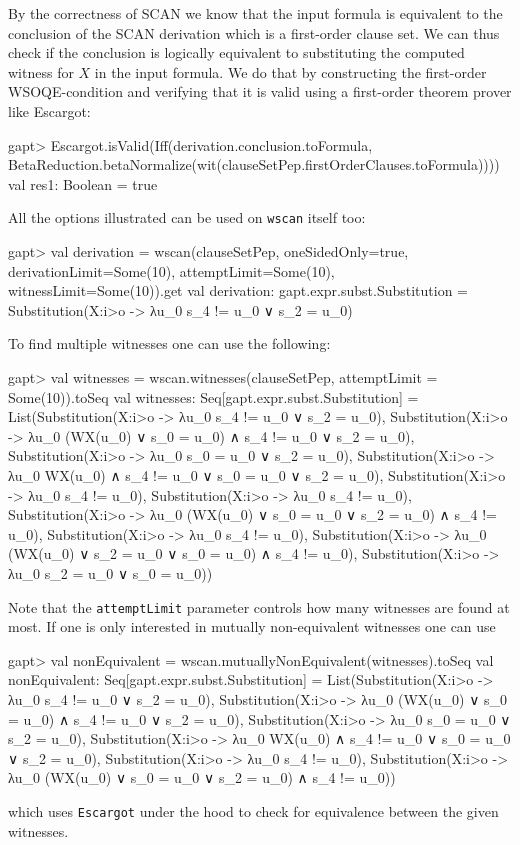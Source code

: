 \documentclass[a4paper,11pt]{book}
\begin{document}
By the correctness of SCAN we know that the input formula is equivalent to the conclusion of the SCAN derivation which is a first-order clause set.
We can thus check if the conclusion is logically equivalent to substituting the computed witness for $X$ in the input formula. We do that by constructing the first-order WSOQE-condition and verifying that it is valid using a first-order theorem prover like Escargot:
\begin{clilisting}
gapt> Escargot.isValid(Iff(derivation.conclusion.toFormula, BetaReduction.betaNormalize(wit(clauseSetPep.firstOrderClauses.toFormula))))
val res1: Boolean = true

\end{clilisting}

All the options illustrated can be used on \texttt{wscan} itself too:
\begin{clilisting}
gapt> val derivation = wscan(clauseSetPep, oneSidedOnly=true, derivationLimit=Some(10), attemptLimit=Some(10), witnessLimit=Some(10)).get
val derivation: gapt.expr.subst.Substitution = Substitution(X:i>o -> λu_0 s_4 != u_0 ∨ s_2 = u_0)

\end{clilisting}

To find multiple witnesses one can use the following:
\begin{clilisting}
gapt> val witnesses = wscan.witnesses(clauseSetPep, attemptLimit = Some(10)).toSeq
val witnesses: Seq[gapt.expr.subst.Substitution] = List(Substitution(X:i>o -> λu_0 s_4 != u_0 ∨ s_2 = u_0), Substitution(X:i>o -> λu_0 (WX(u_0) ∨ s_0 = u_0) ∧ s_4 != u_0 ∨ s_2 = u_0), Substitution(X:i>o -> λu_0 s_0 = u_0 ∨ s_2 = u_0), Substitution(X:i>o -> λu_0 WX(u_0) ∧ s_4 != u_0 ∨ s_0 = u_0 ∨ s_2 = u_0), Substitution(X:i>o -> λu_0 s_4 != u_0), Substitution(X:i>o -> λu_0 s_4 != u_0), Substitution(X:i>o -> λu_0 (WX(u_0) ∨ s_0 = u_0 ∨ s_2 = u_0) ∧ s_4 != u_0), Substitution(X:i>o -> λu_0 s_4 != u_0), Substitution(X:i>o -> λu_0 (WX(u_0) ∨ s_2 = u_0 ∨ s_0 = u_0) ∧ s_4 != u_0), Substitution(X:i>o -> λu_0 s_2 = u_0 ∨ s_0 = u_0))

\end{clilisting}

Note that the \texttt{attemptLimit} parameter controls how many witnesses are found at most.
If one is only interested in mutually non-equivalent witnesses one can use
\begin{clilisting}
gapt> val nonEquivalent = wscan.mutuallyNonEquivalent(witnesses).toSeq
val nonEquivalent: Seq[gapt.expr.subst.Substitution] = List(Substitution(X:i>o -> λu_0 s_4 != u_0 ∨ s_2 = u_0), Substitution(X:i>o -> λu_0 (WX(u_0) ∨ s_0 = u_0) ∧ s_4 != u_0 ∨ s_2 = u_0), Substitution(X:i>o -> λu_0 s_0 = u_0 ∨ s_2 = u_0), Substitution(X:i>o -> λu_0 WX(u_0) ∧ s_4 != u_0 ∨ s_0 = u_0 ∨ s_2 = u_0), Substitution(X:i>o -> λu_0 s_4 != u_0), Substitution(X:i>o -> λu_0 (WX(u_0) ∨ s_0 = u_0 ∨ s_2 = u_0) ∧ s_4 != u_0))

\end{clilisting}
which uses \texttt{Escargot} under the hood to check for equivalence between the given witnesses.
\end{document}
